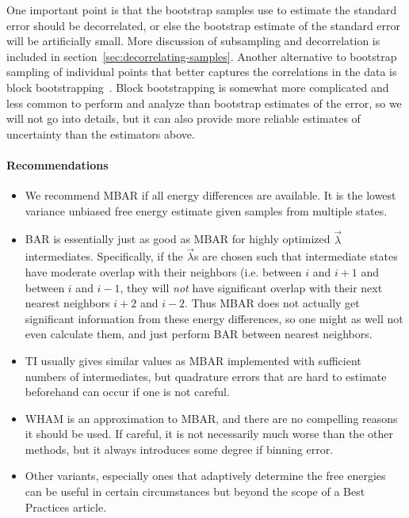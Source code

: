 \documentclass[9pt,bestpractices]{livecoms}
\begin{document}
One important point is that the bootstrap samples use to estimate the standard error should be decorrelated, or else the bootstrap estimate of the standard error will be artificially small.  More discussion of subsampling and decorrelation is included in section~\ref{sec:decorrelating-samples}. Another alternative to bootstrap sampling of individual points that better captures the correlations in the data is block bootstrapping~\cite{???}.  Block bootstrapping is somewhat more complicated and less common to perform and analyze than bootstrap estimates of the error, so we will not go into details, but it can also provide more reliable estimates of uncertainty than the estimators above.


\paragraph{Recommendations}
\begin{itemize}
\item We recommend MBAR if all energy differences are available. It is the lowest variance unbiased free energy estimate given samples from multiple states.
\item BAR is essentially just as good as MBAR for highly optimized $\vec{\lambda}$ intermediates. Specifically, if the $\vec{\lambda}$s are chosen such that intermediate states have moderate overlap with their neighbors (i.e. between $i$ and $i+1$ and between $i$ and $i-1$, they will \textit{not} have significant overlap with their next nearest neighbors $i+2$ and $i-2$. Thus MBAR does not actually get significant information from these energy differences, so one might as well not even calculate them, and just perform BAR between nearest neighbors.~\cite{paliwal2011benchmark} 
\item TI usually gives similar values as MBAR implemented with sufficient numbers of intermediates, but quadrature errors that are hard to estimate beforehand  can occur if one is not careful.~\cite{paliwal2011benchmark}
\item WHAM is an approximation to MBAR, and there are no compelling reasons it should be used. If careful, it is not necessarily much worse than the other methods, but it always introduces some degree if binning error.
\item Other variants, especially ones that adaptively determine the free energies can be useful in certain circumstances but beyond the scope of a Best Practices article.
\end{itemize}
\end{document}
